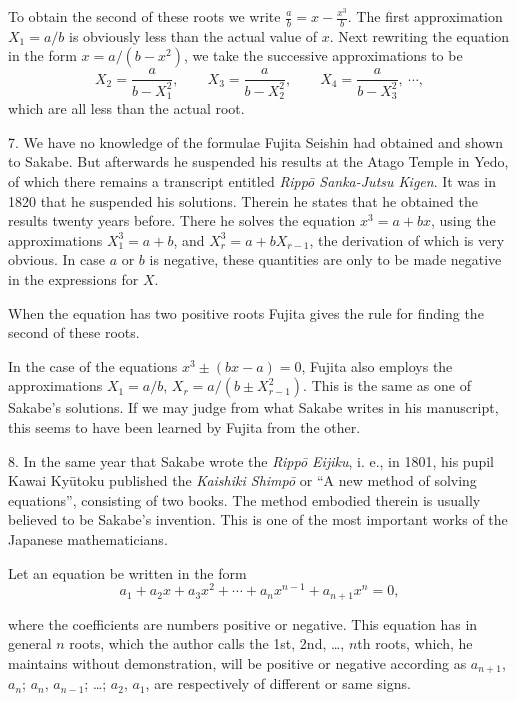 \documentclass[11pt]{article}
\newcommand{\scanpage}[2]{\clearpage\setcounter{footnote}{0}\noindent{\footnotesize\color{gray}PDF page #1 · #2}\par\medskip}
\begin{document}
To obtain the second of these roots we write $\frac{a}{b} = x - \frac{x^3}{b}$. The first approximation $X_1 = a/b$ is obviously less than the actual value of $x$. Next rewriting the equation in the form $x = a/(b - x^2)$, we take the successive approximations to be
\[
X_2 = \frac{a}{b - X_1^2}, \qquad X_3 = \frac{a}{b - X_2^2}, \qquad X_4 = \frac{a}{b - X_3^2}, \ \cdots,
\]
which are all less than the actual root.

7. We have no knowledge of the formulae Fujita Seishin had obtained and shown to Sakabe. But afterwards he suspended his results at the Atago Temple in Yedo, of which there remains a transcript entitled \emph{Rippō Sanka-Jutsu Kigen}. It was in 1820 that he suspended his solutions. Therein he states that he obtained the results twenty years before. There he solves the equation $x^3 = a + bx$, using the approximations $X_1^3 = a + b$, and $X_r^3 = a + bX_{r-1}$, the derivation of which is very obvious. In case $a$ or $b$ is negative, these quantities are only to be made negative in the expressions for $X$.

When the equation has two positive roots Fujita gives the rule for finding the second of these roots.

In the case of the equations $x^3 \pm (bx - a) = 0$, Fujita also employs the approximations $X_1 = a/b$, $X_r = a/(b \pm X_{r-1}^2)$. This is the same as one of Sakabe's solutions. If we may judge from what Sakabe writes in his manuscript, this seems to have been learned by Fujita from the other.

8. In the same year that Sakabe wrote the \emph{Rippō Eijiku}, i. e., in 1801, his pupil Kawai Kyūtoku published the \emph{Kaishiki Shimpō} or ``A new method of solving equations'', consisting of two books. The method embodied therein is usually believed to be Sakabe's invention. This is one of the most important works of the Japanese mathematicians.

Let an equation be written in the form
\[
a_1 + a_2 x + a_3 x^2 + \cdots + a_n x^{n-1} + a_{n+1} x^n = 0,
\]

\scanpage{0278}{printed page 264 (top left)}
where the coefficients are numbers positive or negative. This equation has in general $n$ roots, which the author calls the 1st, 2nd, \dots, $n$th roots, which, he maintains without demonstration, will be positive or negative according as $a_{n+1}$, $a_n$; $a_n$, $a_{n-1}$; \dots; $a_2$, $a_1$, are respectively of different or same signs.
\end{document}

